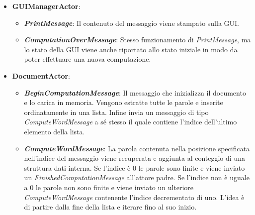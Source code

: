 \begin{itemize}
\begin{itemize}
        \end{itemize}
    \item \textbf{GUIManagerActor}:
        \begin{itemize}
            \item \textbf{\textit{PrintMessage}}: Il contenuto del messaggio viene stampato sulla GUI.
            \item \textbf{\textit{ComputationOverMessage}}: Stesso funzionamento di \textit{PrintMessage}, ma lo stato della GUI viene anche riportato allo stato iniziale in modo da poter effettuare una nuova computazione.
        \end{itemize}
    \item \textbf{DocumentActor}:
        \begin{itemize}
            \item \textbf{\textit{BeginComputationMessage}}: Il messaggio che inizializza il documento e lo carica in memoria. Vengono estratte tutte le parole e inserite ordinatamente in una lista. Infine invia un messaggio di tipo \textit{ComputeWordMessage} a sé stesso il quale contiene l'indice dell'ultimo elemento della lista.
            \item \textbf{\textit{ComputeWordMessage}}: La parola contenuta nella posizione specificata nell'indice del messaggio viene recuperata e aggiunta al conteggio di una struttura dati interna. Se l'indice è 0 le parole sono finite e viene inviato un \textit{FinishedComputationMessage} all'attore padre. Se l'indice non è uguale a 0 le parole non sono finite e viene inviato un ulteriore \textit{ComputeWordMessage} contenente l'indice decrementato di uno. L'idea è di partire dalla fine della lista e iterare fino al suo inizio.
        \end{itemize}
\end{itemize}

